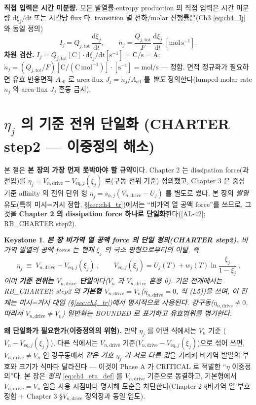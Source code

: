 \documentclass[11pt,a4paper]{article}
\newtheorem*{keybox}{Keystone}
\newcommand{\dd}{\mathrm{d}}
\newcommand{\eff}{\mathrm{eff}}
\newcommand{\eq}{\mathrm{eq}}
\newcommand{\drive}{\mathrm{drive}}
\newcommand{\tot}{\mathrm{tot}}
\newcommand{\AL}[1]{\textsf{[AL-#1]}}
\begin{document}
\textbf{직접 입력은 시간 미분량.} 모든 발열률$\cdot$entropy production 의 직접 입력은 시간 미분량 $\dd\xi_j/\dd t$
또는 시간당 flux 다. transition 별 전하/molar 진행률은(Ch3 \eqref{eq:ch4_Ij} 와 동일 정의)
\begin{equation}
I_j=Q_{j,\tot}\,\frac{\dd\xi_j}{\dd t},\qquad
\dot n_j=\frac{Q_{j,\tot}}{F}\,\frac{\dd\xi_j}{\dd t}\ [\mathrm{mol\,s^{-1}}].
\label{eq:ch4_Ij}
\end{equation}
\textbf{차원 검산.} $I_j=Q_{j,\tot}[\mathrm C]\cdot\dd\xi_j/\dd t[\mathrm{s^{-1}}]=\mathrm{C/s}=\mathrm A$;
$\dot n_j=(Q_{j,\tot}/F)[\mathrm{C}/(\mathrm{C\,mol^{-1}})]\cdot[\mathrm{s^{-1}}]=\mathrm{mol/s}$ — 정합. 면적
정규화가 필요하면 유효 반응면적 $A_{\eff}$ 로 area-flux $J_j=\dot n_j/A_{\eff}$ 를 \emph{별도} 정의한다(lumped
molar rate $\dot n_j$ 와 area-flux $J_j$ 혼동 금지).

\section{$\eta_j$ 의 기준 전위 단일화 (CHARTER step2 — 이중정의 해소)}\label{sec:ch4_eta_single}
본 절은 \textbf{본 장의 가장 먼저 못박아야 할 규약}이다. Chapter 2 는 dissipation force(과전압)를
$\eta_j=V_{n,\drive}-V_{\eq,j}(\xi_j)$ 로(구동 전위 기준) 정의했고, Chapter 3 은 중심 기준 affinity 의
전위 단위 형 $\eta_j=s_{\phi,j}(V_{n,\drive}-U_j)$ 를 별도로 썼다. 본 장의 \emph{발열} 유도(특히 미시=거시
정합, \S\ref{sec:ch4_tr})에서는 ``비가역 열 공액 force''를 쓰므로, 그것을 \textbf{Chapter 2 의 dissipation
force 하나로 단일화}한다(\AL{42}; RB\_CHARTER step2).
\begin{keybox}
\textbf{본 장 비가역 열 공액 force 의 단일 정의(CHARTER step2).} 비가역 발열의 공액 force 는 \emph{현재}
$\xi_j$ 의 국소 평형으로부터의 이탈, 즉
\begin{equation}
\boxed{\;\eta_j\;\equiv\;V_{n,\drive}-V_{\eq,j}(\xi_j)\;,\qquad V_{\eq,j}(\xi_j)=U_j(T)+w_j(T)\ln\frac{\xi_j}{1-\xi_j}\;,}
\label{eq:ch4_eta_def}
\end{equation}
이며 \textbf{기준 전위는 $V_{n,\drive}$ 단일}이다($V_n$ 과 $V_{n,\drive}$ 혼용 0). 기본 전개에서는 RB\_CHARTER
step2 의 \textbf{기본형 $V_{n,\drive}=V_n$}($\eta_{n,\drive}=0$, 식 (L5))을 쓰며, 이 전제는 미시=거시 대입
(\S\ref{sec:ch4_tr})에서 \emph{명시적으로} 사용된다. 강구동($\eta_{n,\drive}\ne0$, 따라서 $V_{n,\drive}\ne V_n$)
일반화는 BOUNDED 로 표기하고 유효범위를 병기한다.
\end{keybox}
\textbf{왜 단일화가 필요한가(이중정의의 위험).} 만약 $\eta_j$ 를 어떤 식에서는 $V_n$ 기준
($V_n-V_{\eq,j}(\xi_j)$), 다른 식에서는 $V_{n,\drive}$ 기준($V_{n,\drive}-V_{\eq,j}(\xi_j)$)으로 섞어 쓰면,
$V_{n,\drive}\ne V_n$ 인 강구동에서 \emph{같은 기호 $\eta_j$ 가 서로 다른 값}을 가리켜 비가역 발열의 부호와
크기가 식마다 달라진다 — 이것이 Phase A 가 CRITICAL 로 적발한 ``$\eta$ 이중정의''다. 본 장은 \emph{정의}
\eqref{eq:ch4_eta_def} 를 $V_{n,\drive}$ 기준으로 동결하고, 기본형에서 $V_{n,\drive}=V_n$ 임을 사용 시점마다
명시해 모순을 차단한다(Chapter 2 \S 비가역 열 부호 정합 + Chapter 3 \S$V_{n,\drive}$ 정의장과 동일 입도).
\end{document}

